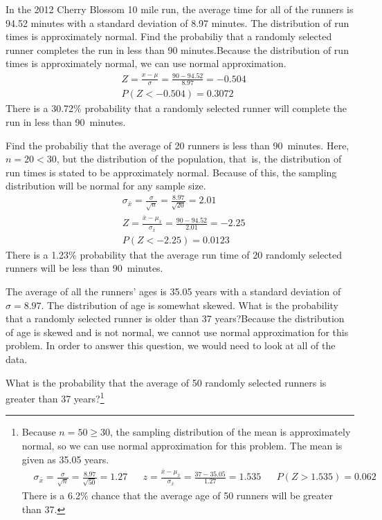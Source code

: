 \textA{\pagebreak}

\begin{example}{
In the 2012 Cherry Blossom 10 mile run, the average time for all of the runners is 94.52 minutes with a standard deviation of 8.97 minutes. The distribution of run times is approximately normal. Find the probabiliy that a randomly selected runner completes the run in less than 90 minutes.}Because the distribution of run times is approximately normal, we can use normal approximation.
\begin{align*}
&Z = \frac{x - \mu}{\sigma}=\frac{90-94.52}{8.97}=-0.504 \\
&P(Z < -0.504) = 0.3072
\end{align*}
There is a 30.72\% probability that a randomly selected runner will complete the run in less than 90~minutes.
\end{example}

\begin{example}{
Find the probabiliy that the average of 20 runners is less than 90~minutes.}
Here, $n=20<30$, but the distribution of the population, that~is, the distribution of run times is stated to be approximately normal. Because of this, the sampling distribution will be normal for any sample size.
\begin{align*}
&\sigma_{\bar{x}}=\frac{\sigma}{\sqrt{n}}=\frac{8.97}{\sqrt{20}}=2.01 \\
&Z = \frac{\bar{x} - \mu_{\bar{x}}}{\sigma_{\bar{x}}}=\frac{90-94.52}{2.01}=-2.25\\
&P(Z < -2.25) = 0.0123
\end{align*}
There is a 1.23\% probability that the average run time of 20 randomly selected runners will be less than 90~minutes.
\end{example}

\begin{example}{
The average of all the runners' ages is 35.05 years with a standard deviation of $\sigma = 8.97$. The distribution of age is somewhat skewed. What is the probability that a randomly selected runner is older than 37 years?}Because the distribution of age is skewed and is not normal, we cannot use normal approximation for this problem. In order to answer this question, we would need to look at all of the data.
\end{example}

\begin{exercise}
What is the probability that the average of 50 randomly selected runners is greater than 37 years?\footnote{Because $n=50\ge 30$, the sampling distribution of the mean is approximately normal, so we can use normal approximation for this problem. The mean is given as 35.05 years.
\begin{align*}
&\sigma_{\bar{x}}
	= \frac{\sigma}{\sqrt{n}}
	= \frac{8.97}{\sqrt{50}}=1.27
&&z=\frac{\bar{x}-\mu_{\bar{x}}}{\sigma_{\bar{x}}} = \frac{37-35.05}{1.27}=1.535
&&P(Z > 1.535) = 0.062
\end{align*}
There is a 6.2\% chance that the average age of 50 runners will be greater than 37.} 
\end{exercise}

